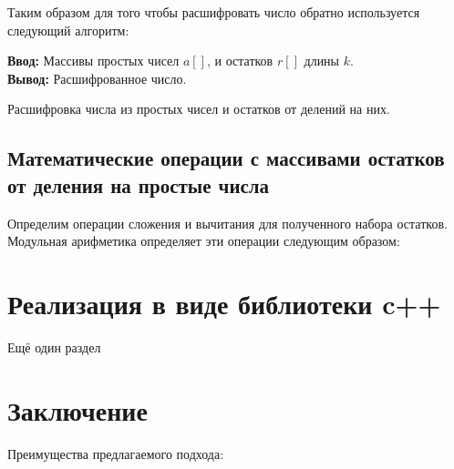 \documentclass[10pt]{article}
\begin{document}
Таким образом для того чтобы расшифровать число обратно используется следующий алгоритм:

\begin{algorithm}[H]
	\textbf{Ввод:} Массивы простых чисел $a[]$, и остатков $r[]$ длины $k$.\\
	\textbf{Вывод:} Расшифрованное число.
	\begin{algorithmic}
	\end{algorithmic}
	\caption{Расшифровка числа из простых чисел и остатков от делений на них.}
	\label{algo:crt_decription}
\end{algorithm}


\subsection{Математические операции с массивами остатков от деления на простые числа}

Определим операции сложения и вычитания для полученного набора остатков. Модульная арифметика \cite{omondi2007residue, soderstrand1986residue} определяет эти операции следующим образом: 


\section {Реализация в виде библиотеки c++}

Ещё один раздел

\section{Заключение}

Преимущества предлагаемого подхода:
\end{document}
